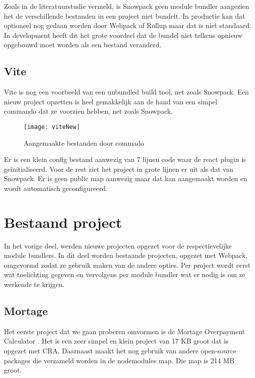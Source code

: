 Zoals in de literatuurstudie vermeld, is Snowpack geen module bundler aangezien het de verschillende bestanden in een project niet bundelt. In productie kan dat optioneel nog gedaan worden door Webpack of Rollup maar dat is niet standaard. In development heeft dit het grote voordeel dat de bundel niet telkens opnieuw opgebouwd moet worden als een bestand veranderd. 

\subsection{Vite}
Vite is nog een voorbeeld van een unbundled build tool, net zoals Snowpack. Een nieuw project opzetten is heel gemakkelijk aan de hand van een simpel commando dat ze voorzien hebben, net zoals Snowpack. 



\begin{figure}[h]
    \texttt{[image: viteNew]}
        \centering
        \caption[Aangemaakte bestanden door Vite commando]{Aangemaakte bestanden door commado}
    \end{figure}

Er is een klein config bestand aanwezig van 7 lijnen code waar de react plugin is geïnitialiseerd. Voor de rest ziet het project in grote lijnen er uit als dat van Snowpack. Er is geen public map aanwezig maar dat kan aangemaakt worden en wordt automatisch geconfigureerd.

\section{Bestaand project}
In het vorige deel, werden nieuwe projecten opgezet voor de respectievelijke module bundlers. In dit deel worden bestaande projecten, opgezet met Webpack, omgevormd zodat ze gebruik maken van de andere opties. Per project wordt eerst wat toelichting gegeven en vervolgens per module bundler wat er nodig is om ze werkende te krijgen. 

\subsection{Mortage}
Het eerste project dat we gaan proberen omvormen is de Mortage Overpayment Calculator \autocite{houghton-2019}.
Het is een zeer simpel en klein project van 17 KB groot dat is opgezet met CRA. 
Daarnaast maakt het nog gebruik van andere open-source packages die verzameld worden in de nodemodules map. 
Die map is 214 MB groot. 

